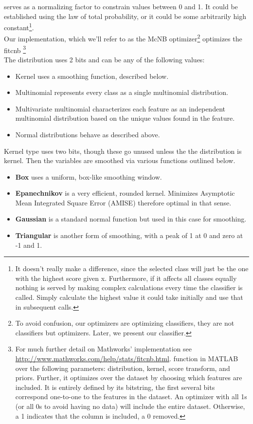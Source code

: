 serves as a normalizing factor to constrain values between 0 and 1.  It could
be established using the law of total probability, or it could be some
arbitrarily high constant\footnote{It doesn't really make a difference, since the selected class will just be the one with the highest score given x. 	Furthermore, if it affects all classes equally nothing is served by making
complex calculations every time the classifier is called.  Simply calculate the highest value it could take initially and use that in subsequent calls.}.  \\Our implementation, which we'll refer to as the McNB optimizer\footnote{To avoid confusion, our optimizers are optimizing classifiers, they are not classifiers but optimizers.  Later, we present our classifier.} optimizes the fitcnb  \footnote{For much further
detail on Mathworks' implementation see
\url{http://www.mathworks.com/help/stats/fitcnb.html}.   function in MATLAB over the following parameters: distribution, kernel, score transform, and priors.  Further, it optimizes over the dataset by choosing which features are included.  It is entirely defined by its bitstring, the first several bits correspond one-to-one to the features in the dataset.  An optimizer with all 1s (or all 0s to avoid having no data) will include the entire dataset.  Otherwise, a 1 indicates that the column is included, a 0 removed.
}  \\
The distribution uses 2 bits and can be any of the following values:\\
\begin{itemize}\item Kernel uses a smoothing function, described below.\item
	Multinomial represents every class as a single multinomial distribution.\item
	Multivariate multinomial characterizes each feature as an independent
	multinomial distribution based on the unique values found in the feature.\item
	Normal distributions behave as described above.
\end{itemize}
Kernel type uses two bits, though these go unused unless the the distribution is
kernel.  Then the variables are smoothed via various functions outlined below.
\begin{itemize}
	\item \textbf{Box} uses a uniform, box-like smoothing window.
	\item \textbf{Epanechnikov} is a very efficient, rounded kernel.  Minimizes
	Asymptotic Mean Integrated Square Error (AMISE)\cite{stefanie_scheid_introduction_2004} therefore optimal
	in that sense.
	\item \textbf{Gaussian} is a standard normal function but used in this case for
	smoothing.
	\item \textbf{Triangular} is another form of smoothing, with a peak of 1 at 0
	and zero at -1 and 1.
\end{itemize}
